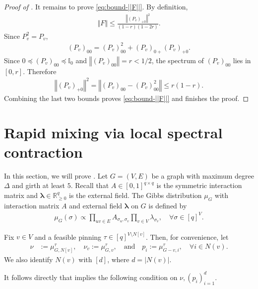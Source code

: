 \documentclass[a4paper,12pt]{article}
\theoremstyle{plain}
\theoremstyle{definition}
\def\*#1{\mathbf{#1}} %
\def\*#1{\boldsymbol{#1}} %
\newcommand{\norm}[1]{\left\Vert#1\right\Vert}
\newcommand{\abs}[1]{\left\vert#1\right\vert}
\begin{document}
\begin{proof}[Proof of ]
It remains to prove \eqref{eq:bound-||F||}.  By definition,
\begin{align*}
  \norm{F} \leq
  \frac{\norm{(P_v)_{+0}}^2}{(1-r)(1-2r)}.
\end{align*}
Since $P_v^2=P_v$,
\begin{align*}
  (P_v)_{00}=(P_v)_{00}^2+(P_v)_{0+}(P_v)_{+0}.
\end{align*}
Since $0\preceq(P_v)_{00}\preceq\mathbb I_0$ and
$\norm{(P_v)_{00}}=r<1/2$, the spectrum of $(P_v)_{00}$ lies in $[0,r]$.
Therefore
\begin{align*}
  \norm{(P_v)_{+0}}^2
  =\norm{(P_v)_{00}-(P_v)_{00}^2}
  \leq r(1-r).
\end{align*}
Combining the last two bounds proves \eqref{eq:bound-||F||} and finishes
the proof.
\end{proof}


\section{Rapid mixing via local spectral contraction}\label{sec:general}
In this section, we will prove .
Let $G = (V,E)$ be a graph with maximum degree $\Delta$ and girth at least $5$.
Recall that $A \in [0,1]^{q\times q}$ is the symmetric interaction matrix and $\*\lambda \in \mathbb{R}_{\geq 0}^q$ is the external field.
The Gibbs distribution $\mu_G$ with interaction matrix $A$ and external field $\*\lambda$ on $G$ is defined by
\begin{align*}
  \mu_G(\sigma) \propto \prod_{uv \in E} A_{\sigma_u,\sigma_v} \prod_{v\in V} \lambda_{\sigma_v}, \quad \forall \sigma \in [q]^V.
\end{align*}

Fix $v \in V$ and a feasible pinning $\tau \in [q]^{V\setminus N[v]}$.
Then, for convenience, let
\begin{align} \label{eq:def-nu-pi}
  \nu &:= \mu^\tau_{G,N[v]},
  \quad
  \nu_v := \mu^\tau_{G,v},
  \quad \text{and} \quad
  p_i := \mu^\tau_{G-v, i}, \quad \forall i\in N(v).
\end{align}
We also identify $N(v)$ with $[d]$, where $d = \abs{N(v)}$.

It follows directly that  implies the following condition on $\nu, (p_i)_{i=1}^d$.
\end{document}

